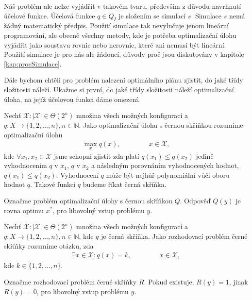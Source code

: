 Náš problém ale nelze vyjádřit v takovém tvaru, především z důvodu navrhnutí účelové funkce.
Účelová funkce $q \in Q_I$ je složením se simulací $s$. Simulace $s$ nemá žádný matematický předpis.
Použití simulace tak nevylučuje jenom lineární programování, ale obecně všechny metody, kde je potřeba optimalizační úlohu vyjádřit jako
soustavu rovnic nebo nerovnic, které ani nemusí být lineární.
Použití simulace je pro nás ale žádoucí, důvody proč jsou diskutovány v kapitole \ref{kap:procSimulace}.

Dále bychom chtěli pro problém nalezení optimálního plánu zjistit, do jaké třídy složitosti náleží. 
Ukažme si první, do jaké třídy složitosti náleží optimalizační úloha, na jejíž účelovou funkci dáme omezení.

\begin{definice}\label{df:Q}
  Nechť $\mathcal{X} \colon |\mathcal{X}| \in \Theta(2^n)$ množina všech možných konfigurací a $q \colon X \rightarrow \{ 1, 2, \dots, n \}, n \in \mathbb{N}$.
  Jako optimalizační úlohu s černou skříňkou rozumíme optimalizační úlohu
  \begin{align*}
    \max_{x} q(x), \hspace{50pt} x \in \mathcal{X},
  \end{align*}
  kde $\forall x_1, x_2 \in \mathcal{X}$ jsme schopni zjistit zda platí $q(x_1) \leq q(x_2)$ jedině vyhodnocením $q$ v $x_1$,
  $q$ v $x_2$ a následným porovnáním vyhodnocených hodnot, $q(x_1) \leq q(x_2)$.
  Vyhodnocení $q$ může být nejhůř polynomiální vůči oboru hodnot $q$.
  Takové funkci $q$ budeme říkat černá skříňka.

  Označme problém optimalizační úlohy s černou skříňkou $Q$.
  Odpověď $Q(y)$ je rovna optimu $x^*$, pro libovolný vstup problému $y$.
\end{definice}

\begin{definice}\label{df:R}
  Nechť $\mathcal{X} \colon |\mathcal{X}| \in \Theta(2^n)$ množina všech možných konfigurací a $q \colon X \rightarrow \{ 1, 2, \dots, n \}, n \in \mathbb{N}$,
  kde $q$ je černá skříňka.
  Jako rozhodovací problém černé skříňky rozumíme otázku, zda
  \begin{align*}
    \exists x \in \mathcal{X} \colon q(x) = k, \hspace{50pt} x \in \mathcal{X},
  \end{align*}
  kde $k \in \{ 1, 2, \dots, n \}$.

  Označme rozhodovací problém černé skříňky $R$.
  Pokud existuje, $R(y) = 1$, jinak $R(y) = 0$, pro libovolný vstup problému $y$. 
\end{definice}

